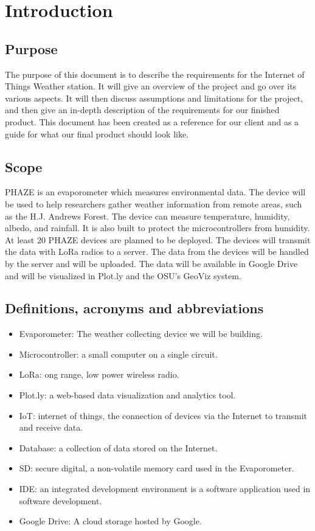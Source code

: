 \documentclass[onecolumn, draftclsnofoot,10pt, compsoc]{IEEEtran}
\begin{document}
\section{Introduction}
\subsection{Purpose}
The purpose of this document is to describe the requirements for the Internet of Things Weather station. It will give an overview of the project and go over its various aspects. It will then discuss assumptions and limitations for the project, and then give an in-depth description of the requirements for our finished product. This document has been created as a reference for our client and as a guide for what our final product should look like.
\subsection{Scope}
PHAZE is an evaporometer which measures environmental data. The device will be used to help researchers gather weather information from remote areas, such as the H.J. Andrews Forest. The device can measure temperature, humidity, albedo, and rainfall. It is also built to protect the microcontrollers from humidity. 
\newline
At least 20 PHAZE devices are planned to be deployed. The devices will transmit the data with LoRa radios to a server. The data from the devices will be handled by the server and will be uploaded. The data will be available in Google Drive and will be visualized in Plot.ly and the OSU's GeoViz system. 

\subsection{Definitions, acronyms and abbreviations}
\begin{itemize}
\item Evaporometer: The weather collecting device we will be building.
\item Microcontroller: a small computer on a single circuit.
\item LoRa: ong range, low power wireless radio.
\item Plot.ly: a web-based data visualization and analytics tool.
\item IoT: internet of things, the connection of devices via the Internet to transmit and receive data.
\item Database: a collection of data stored on the Internet.
\item SD: secure digital, a non-volatile memory card used in the Evaporometer.
\item IDE: an integrated development environment is a software application used in software development.
\item Google Drive: A cloud storage hosted by Google.
\end{itemize}
\end{document}
